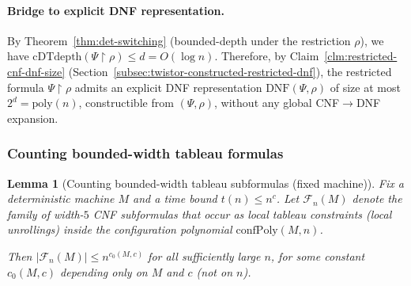 \documentclass[12pt]{article}
\newtheorem{lemma}[theorem]{Lemma}
\theoremstyle{definition}
\theoremstyle{definition}
\theoremstyle{remark}
\theoremstyle{remark}
\begin{document}
\paragraph{Bridge to explicit DNF representation.}
By Theorem~\ref{thm:det-switching} (bounded-depth under the restriction $\rho$),
we have $\mathrm{cDTdepth}(\Psi\upharpoonright \rho)\le d=O(\log n)$.
Therefore, by Claim~\ref{clm:restricted-cnf-dnf-size} (Section~\ref{subsec:twistor-constructed-restricted-dnf}),
the restricted formula $\Psi\upharpoonright \rho$ admits an explicit DNF representation
$\mathrm{DNF}(\Psi,\rho)$ of size at most $2^d=\mathrm{poly}(n)$, constructible from $(\Psi,\rho)$,
without any global CNF$\to$DNF expansion.

\subsubsection{Counting bounded-width tableau formulas}

\begin{lemma}[Counting bounded-width tableau subformulas (fixed machine)]
\label{lem:bounded-width-formula-count}\label{lem:count-tableau-subformulas-fixed-M}
Fix a deterministic machine $M$ and a time bound $t(n)\le n^c$.
Let $\mathcal{F}_n(M)$ denote the family of width-$5$ CNF subformulas that occur as local tableau
constraints (local unrollings) inside the configuration polynomial $\mathrm{confPoly}(M,n)$.

Then $|\mathcal{F}_n(M)|\le n^{c_0(M,c)}$ for all sufficiently large $n$, for some constant $c_0(M,c)$
depending only on $M$ and $c$ (not on $n$).
\end{lemma}
\end{document}

